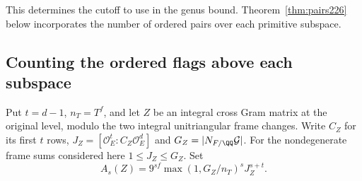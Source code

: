 \documentclass[a4paper,11pt]{article}
\theoremstyle{definition}
\theoremstyle{remark}
\numberwithin{equation}{section}
\begin{document}
This determines the cutoff to use in the genus bound. Theorem~\ref{thm:pairs226} below incorporates the number of ordered pairs over each primitive subspace.

\subsection{Counting the ordered flags above each subspace}\label{nav:IX-28}
Put \(t=d-1\), \(n_T=T^f\), and let \(Z\) be an integral
cross Gram matrix at the original level, modulo the two
integral unitriangular frame changes. Write \(C_Z\) for its
first \(t\) rows, \(J_Z=[\mathcal O_E^t:C_Z\mathcal O_E^d]\)
and \(G_Z=|N_{F/\QQ}\mathcal G|\). For the nondegenerate
frame sums considered here \(1\le J_Z\le G_Z\). Set
\[
     A_s(Z)=9^{sf}\max(1,G_Z/n_T)^s J_Z^{s+t}.
\]
\end{document}
